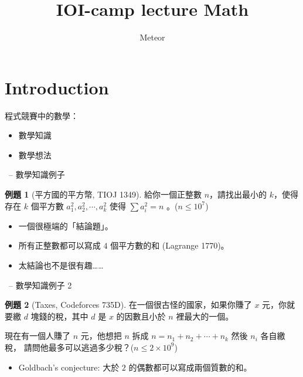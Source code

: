 \documentclass[notheorems,xcolor=dvipsnames]{beamer}
\title{IOI-camp lecture Math}
\author{Meteor}
\theoremstyle{definition}
\newtheorem{problem}{例題}
\begin{document}
\begin{frame}
  \titlepage
\end{frame}

\section{Introduction}

\begin{frame}{\secname}
  程式競賽中的數學：

  \begin{itemize}
    \setlength{\itemindent}{2em}
    \item<2-> 數學知識
    \item<3> 數學想法
  \end{itemize}
\end{frame}

\begin{frame}[t]{\secname \ -- 數學知識例子}
  \begin{problem}[平方國的平方幣, TIOJ 1349]
    給你一個正整數 $n$，請找出最小的 $k$，使得存在 $k$ 個平方數 $a_1^2, a_2^2, \cdots, a_k^2$
    使得 $\sum a_i^2 = n$ 。($n \leq 10^7$)
  \end{problem}

  \begin{itemize}
    \item<2-> 一個很極端的「結論題」。
    \item<3-> 所有正整數都可以寫成 $4$ 個平方數的和 (Lagrange 1770)。
    \item<4-> 太結論也不是很有趣……
  \end{itemize}
\end{frame}

\begin{frame}[t]{\secname \ -- 數學知識例子 2}
  \begin{problem}[Taxes, Codeforces 735D]%
    在一個很古怪的國家，如果你賺了 $x$ 元，你就要繳 $d$ 塊錢的稅，其中 $d$ 是 $x$ 的因數且小於
    $n$ 裡最大的一個。

    \medskip
    現在有一個人賺了 $n$ 元，他想把 $n$ 拆成 $n = n_1 + n_2 + \cdots + n_k$ 然後 $n_i$ 各自繳稅，
    請問他最多可以逃過多少稅？($n \leq 2 \times 10^9$)
  \end{problem}

  \begin{itemize}
    \item<2-> Goldbach's conjecture: 大於 $2$ 的偶數都可以寫成兩個質數的和。
  \end{itemize}
\end{frame}
\end{document}
